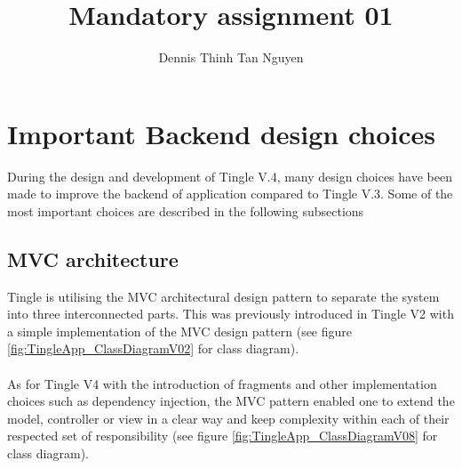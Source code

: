 \documentclass{article}
\title{Mandatory assignment 01}
\author{Dennis Thinh Tan Nguyen}
\begin{document}
\maketitle
\newpage
\tableofcontents

\newpage
\section{Important Backend design choices}
During the design and development of Tingle V.4, many design choices have been made to improve the backend of application compared to Tingle V.3.
Some of the most important choices are described in the following subsections


\subsection{MVC architecture}
Tingle is utilising the MVC architectural design pattern to separate the system into three interconnected parts. This was previously introduced in Tingle V2 with a simple implementation of the MVC design pattern (see figure \ref{fig:TingleApp_ClassDiagramV02} for class diagram).\\\\As for Tingle V4 with the introduction of fragments and other implementation choices such as dependency injection, the MVC pattern enabled one to extend the model, controller or view in a clear way and keep complexity within each of their respected set of responsibility (see figure \ref{fig:TingleApp_ClassDiagramV08} for class diagram).
\end{document}
